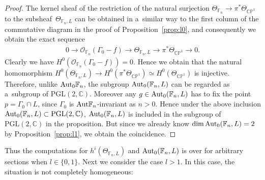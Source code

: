 \documentclass[11pt]{article}
\numberwithin{equation}{section}
\begin{document}
\begin{proof}
The kernel sheaf of the restriction of the natural surjection $\Theta_{\mathbb{F}_n}\to \pi^*\Theta_{\mathbb{CP}^1}$ to
the subsheaf~$\Theta_{\mathbb{F}_n,L}$ can be obtained in a~similar way to the f\/irst column of the commutative diagram
in the proof of Proposition~\ref{prop:l0}, and consequently we obtain the exact sequence
\begin{gather}
\label{ntses}
0
 \longrightarrow
\mathscr O_{\mathbb{F}_n} (\Gamma_0 - f)
 \longrightarrow
\Theta_{\mathbb{F}_n,L}
 \longrightarrow
\pi^*\Theta_{\mathbb{CP}^1}
\longrightarrow
0.
\end{gather}
Clearly we have $H^0 (\mathscr O_{\mathbb{F}_n} (\Gamma_0 - f ) )=0$.
Hence we obtain that the natural homomorphism $H^0(\Theta_{\mathbb{F}_n,L} ) \to H^0( \pi^*\Theta_{\mathbb{CP}^1})\simeq
H^0(\Theta_{\mathbb{CP}^1})$ is injective.
Therefore, unlike ${\rm{Aut}}_0\mathbb{F}_n$, the subgroup ${\rm{Aut}}_0(\mathbb{F}_n,L)$ can be regarded as
a~subgroup of $\mathrm{PGL}(2,\mathbb{C})$.
Moreover any $g\in {\rm{Aut}}_0(\mathbb{F}_n,L)$ has to f\/ix the point $p = \Gamma_0\cap L$, since $\Gamma_0$ is
${\rm{Aut}}\mathbb{F}_n$-invariant as $n>0$.
Hence under the above inclusion ${\rm{Aut}}_0(\mathbb{F}_n,L)\subset\mathrm{PGL}(2,\mathbb{C})$,
${\rm{Aut}}_0(\mathbb{F}_n,L)$ is included in the subgroup of $\mathrm{PGL}(2,\mathbb{C})$ in the proposition.
But since we already know $\dim {\rm{Aut}}_0(\mathbb{F}_n,L)=2$ by Proposition~\ref{prop:l1}, we obtain the coincidence.
\end{proof}

Thus the computations for $h^i(\Theta_{\mathbb{F}_n,L})$ and ${\rm{Aut}}_0(\mathbb{F}_n,L)$ is over for arbitrary
sections when $l\in \{0,1\}$.
Next we consider the case $l>1$.
In this case, the situation is not completely homogeneous:
\end{document}
